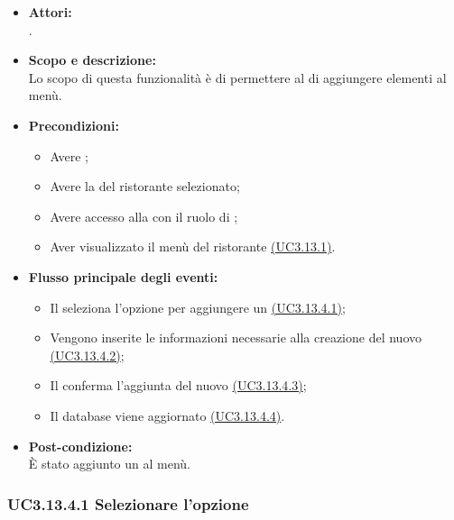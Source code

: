 \begin{itemize}
	\item \textbf{Attori:}
	\\.
	\item \textbf{Scopo e descrizione:} 
	\\Lo scopo di questa funzionalità è di permettere al  di aggiungere elementi al menù.
	\item \textbf{Precondizioni:}
	\begin{itemize}
		\item Avere ;
		\item Avere la  del ristorante selezionato;
		\item Avere accesso alla  con il ruolo di ;
		\item Aver visualizzato il menù del ristorante \hyperref[UC3.13.1]{(UC3.13.1)}.
	\end{itemize}
	\item \textbf{Flusso principale degli eventi:}
	\begin{itemize}
		\item Il  seleziona l'opzione per aggiungere un  \hyperref[UC3.13.4.1]{(UC3.13.4.1)};
		\item Vengono inserite le informazioni necessarie alla creazione del nuovo  \hyperref[UC3.13.4.2]{(UC3.13.4.2)};
		\item Il  conferma l'aggiunta del nuovo  \hyperref[UC3.13.4.3]{(UC3.13.4.3)};
		\item Il database viene aggiornato \hyperref[UC3.13.4.4]{(UC3.13.4.4)}.
	\end{itemize}
	\item \textbf{Post-condizione:}
	\\È stato aggiunto un  al menù.
\end{itemize}

\subsubsection{UC3.13.4.1 Selezionare l'opzione } \label{UC3.13.4.1}

